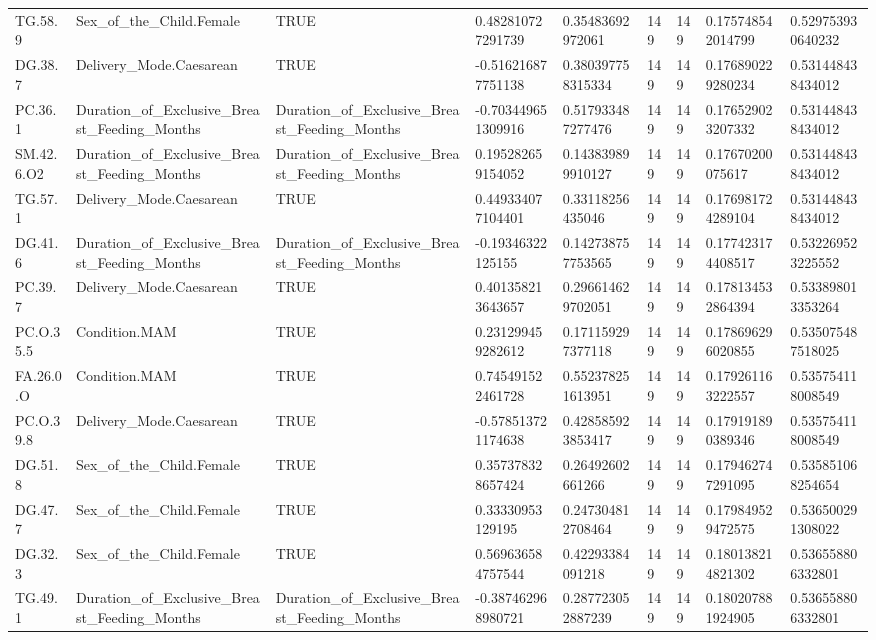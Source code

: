 \begin{longtable}{lllllllll}
TG.58.9 & Sex\_of\_the\_Child.Female & TRUE & 0.482810727291739 & 0.35483692972061 & 149 & 149 & 0.175748542014799 & 0.529753930640232 \\
DG.38.7 & Delivery\_Mode.Caesarean & TRUE & -0.516216877751138 & 0.380397758315334 & 149 & 149 & 0.176890229280234 & 0.531448438434012 \\
PC.36.1 & Duration\_of\_Exclusive\_Breast\_Feeding\_Months & Duration\_of\_Exclusive\_Breast\_Feeding\_Months & -0.703449651309916 & 0.517933487277476 & 149 & 149 & 0.176529023207332 & 0.531448438434012 \\
SM.42.6.O2 & Duration\_of\_Exclusive\_Breast\_Feeding\_Months & Duration\_of\_Exclusive\_Breast\_Feeding\_Months & 0.195282659154052 & 0.143839899910127 & 149 & 149 & 0.17670200075617 & 0.531448438434012 \\
TG.57.1 & Delivery\_Mode.Caesarean & TRUE & 0.449334077104401 & 0.33118256435046 & 149 & 149 & 0.176981724289104 & 0.531448438434012 \\
DG.41.6 & Duration\_of\_Exclusive\_Breast\_Feeding\_Months & Duration\_of\_Exclusive\_Breast\_Feeding\_Months & -0.19346322125155 & 0.142738757753565 & 149 & 149 & 0.177423174408517 & 0.532269523225552 \\
PC.39.7 & Delivery\_Mode.Caesarean & TRUE & 0.401358213643657 & 0.296614629702051 & 149 & 149 & 0.178134532864394 & 0.533898013353264 \\
PC.O.35.5 & Condition.MAM & TRUE & 0.231299459282612 & 0.171159297377118 & 149 & 149 & 0.178696296020855 & 0.535075487518025 \\
FA.26.0.O & Condition.MAM & TRUE & 0.745491522461728 & 0.552378251613951 & 149 & 149 & 0.179261163222557 & 0.535754118008549 \\
PC.O.39.8 & Delivery\_Mode.Caesarean & TRUE & -0.578513721174638 & 0.428585923853417 & 149 & 149 & 0.179191890389346 & 0.535754118008549 \\
DG.51.8 & Sex\_of\_the\_Child.Female & TRUE & 0.357378328657424 & 0.26492602661266 & 149 & 149 & 0.179462747291095 & 0.535851068254654 \\
DG.47.7 & Sex\_of\_the\_Child.Female & TRUE & 0.33330953129195 & 0.247304812708464 & 149 & 149 & 0.179849529472575 & 0.536500291308022 \\
DG.32.3 & Sex\_of\_the\_Child.Female & TRUE & 0.569636584757544 & 0.42293384091218 & 149 & 149 & 0.180138214821302 & 0.536558806332801 \\
TG.49.1 & Duration\_of\_Exclusive\_Breast\_Feeding\_Months & Duration\_of\_Exclusive\_Breast\_Feeding\_Months & -0.387462968980721 & 0.287723052887239 & 149 & 149 & 0.180207881924905 & 0.536558806332801 \\

\end{longtable}
